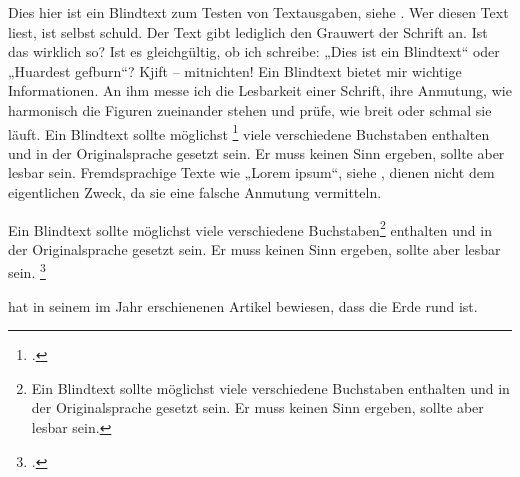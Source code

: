\documentclass[12pt,ngerman]{scrartcl}
\begin{document}
\blindtext

Dies hier ist ein Blindtext zum Testen von Textausgaben, siehe \cite{Ziegenhagen2023}. Wer diesen Text liest, ist selbst schuld. Der Text gibt lediglich den Grauwert der Schrift an. Ist das wirklich so? Ist es gleichgültig, ob ich schreibe: „Dies ist ein Blindtext“ oder „Huardest gefburn“? Kjift – mitnichten! Ein \cite{Knuth1982} Blindtext bietet mir wichtige Informationen. An ihm messe ich die Lesbarkeit einer Schrift, ihre Anmutung, wie harmonisch die Figuren zueinander stehen und prüfe, wie breit oder schmal sie läuft. Ein Blindtext sollte möglichst \footcite{Ziegenhagen2022} viele verschiedene Buchstaben enthalten und in der Originalsprache gesetzt sein. Er muss keinen Sinn ergeben, sollte aber lesbar sein. Fremdsprachige Texte wie „Lorem ipsum“, siehe \cite{Knuth1982}, dienen nicht dem eigentlichen Zweck, da sie eine falsche Anmutung vermitteln.

\clearpage

\parencite{Knuth1982}

\clearpage

Ein Blindtext sollte möglichst viele verschiedene Buchstaben\footnote{Ein Blindtext sollte möglichst viele verschiedene Buchstaben enthalten und in der Originalsprache gesetzt sein. Er muss keinen Sinn ergeben, sollte aber lesbar sein.} enthalten und in der Originalsprache gesetzt sein. Er muss keinen Sinn ergeben, sollte aber lesbar sein. \footcite{Knuth1982}

\clearpage

\citeauthor{Ziegenhagen2023} hat in seinem im Jahr \citeyear{Ziegenhagen2023} erschienenen Artikel  bewiesen, dass die Erde rund ist.

\printbibliography[title={Artikel},type=article]

\printbibliography[title={Bücher},type=book]

\printbibliography[title={Internetreferenzen},type=online]
\end{document}
